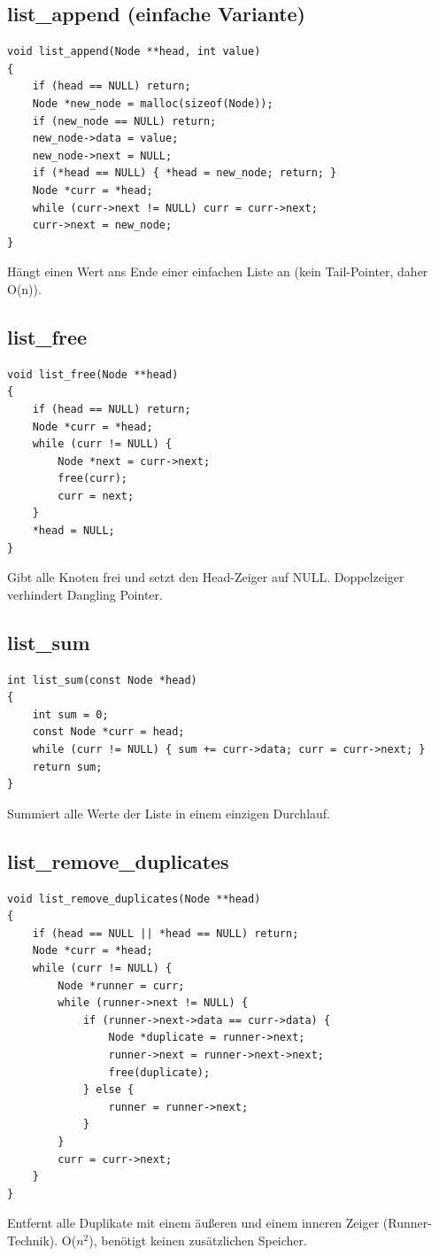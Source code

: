 \documentclass[10pt, a4paper]{article}
\begin{document}
\subsection{list\_append (einfache Variante)}
\begin{lstlisting}
void list_append(Node **head, int value)
{
    if (head == NULL) return;
    Node *new_node = malloc(sizeof(Node));
    if (new_node == NULL) return;
    new_node->data = value;
    new_node->next = NULL;
    if (*head == NULL) { *head = new_node; return; }
    Node *curr = *head;
    while (curr->next != NULL) curr = curr->next;
    curr->next = new_node;
}
\end{lstlisting}
H\"angt einen Wert ans Ende einer einfachen Liste an (kein Tail-Pointer, daher O(n)).

\subsection{list\_free}
\begin{lstlisting}
void list_free(Node **head)
{
    if (head == NULL) return;
    Node *curr = *head;
    while (curr != NULL) {
        Node *next = curr->next;
        free(curr);
        curr = next;
    }
    *head = NULL;
}
\end{lstlisting}
Gibt alle Knoten frei und setzt den Head-Zeiger auf NULL. Doppelzeiger verhindert Dangling Pointer.

\subsection{list\_sum}
\begin{lstlisting}
int list_sum(const Node *head)
{
    int sum = 0;
    const Node *curr = head;
    while (curr != NULL) { sum += curr->data; curr = curr->next; }
    return sum;
}
\end{lstlisting}
Summiert alle Werte der Liste in einem einzigen Durchlauf.

\subsection{list\_remove\_duplicates}
\begin{lstlisting}
void list_remove_duplicates(Node **head)
{
    if (head == NULL || *head == NULL) return;
    Node *curr = *head;
    while (curr != NULL) {
        Node *runner = curr;
        while (runner->next != NULL) {
            if (runner->next->data == curr->data) {
                Node *duplicate = runner->next;
                runner->next = runner->next->next;
                free(duplicate);
            } else {
                runner = runner->next;
            }
        }
        curr = curr->next;
    }
}
\end{lstlisting}
Entfernt alle Duplikate mit einem \"au\ss eren und einem inneren Zeiger (Runner-Technik). O($n^2$), ben\"otigt keinen zus\"atzlichen Speicher.
\end{document}
